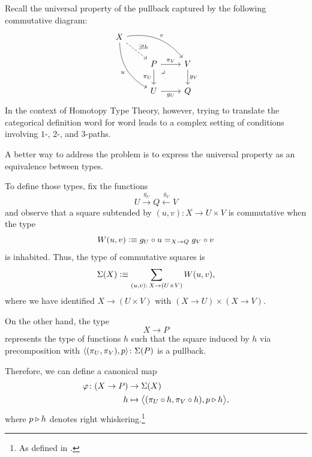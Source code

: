 \begin{solution}
    Recall the universal property of the pullback captured by the following commutative diagram:
    \[
        \begin{tikzcd}
            X
                    \arrow[rdd,bend right,"u"']
                    \arrow[rrd,bend left,"v"]
                    \arrow[rd,"\exists!h",dashed]\\
                &P
                    \arrow[r,"\pi_V"]
                    \arrow[d,"\pi_U"']
                    \arrow[rd,
                        "\lrcorner",
                        phantom,
                        very near start]
                &V
                    \arrow[d,"g_V"]\\
                &U
                    \arrow[r,"g_U"']
                &Q
        \end{tikzcd}
    \]
    In the context of Homotopy Type Theory, however, trying to translate the categorical definition word for word leads to a complex setting of conditions involving $1$-, $2$-, and $3$-paths.

    A better way to address the problem is to express the universal property as an equivalence between types.

    To define those types, fix the functions
    \[
        U\xrightarrow{g_U}Q\xleftarrow{g_V}V
    \]
    and observe that a square subtended by $(u,v)\colon X\to U\times V$ is commutative when the type
    \[
        W(u,v)\mathrel{\vcentcolon}\equiv g_U\circ u
            \mathrel{=_{X\to Q}}
            g_V\circ v
    \]
    is inhabited. Thus, the type of commutative squares is
    \[
        \Sigma(X)\defeq\sum_{(u,v)\colon X\to(U\times V)}
            W(u,v),
    \]
    where we have identified $X\to(U\times V)$ with $(X\to U)\times(X\to V)$.

    On the other hand, the type
    \[
        X\to P
    \]
    represents the type of functions $h$ such that the square induced by $h$ via precomposition with $\dep{(\pi_U,\pi_V),p}\colon \Sigma(P)$ is a pullback.

    Therefore, we can define a canonical map
    \begin{align*}
        \varphi\colon (X\to P)&\to \Sigma(X)\\
        h &\mapsto
            \bigdep{
                (\pi_U\circ h,\pi_V\circ h),
                p\rwct h
            },
    \end{align*}
    where $p\triangleright h$ denotes right whiskering.\footnote{As defined in .}
    

\end{solution}

